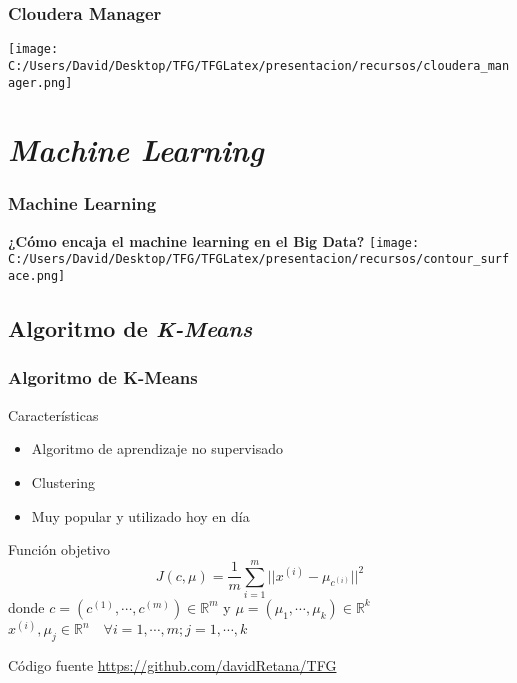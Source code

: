\documentclass{beamer}
\begin{document}
\begin{frame}
  \frametitle{Cloudera Manager}
  \texttt{[image: C:/Users/David/Desktop/TFG/TFGLatex/presentacion/recursos/cloudera\_manager.png]}
\end{frame}


\section{\textit{Machine Learning}}

\begin{frame} %
\frametitle{Machine Learning}
\textbf{¿Cómo encaja el machine learning en el Big Data?}
\centering
\texttt{[image: C:/Users/David/Desktop/TFG/TFGLatex/presentacion/recursos/contour\_surface.png]}
\end{frame}


\subsection{Algoritmo de \textit{K-Means}}

\begin{frame}[fragile] %
\frametitle{Algoritmo de K-Means}

\begin{block}{Características}
  \begin{itemize}
    \item Algoritmo de aprendizaje no supervisado
    \item Clustering
    \item Muy popular y utilizado hoy en día
  \end{itemize}
\end{block}

\begin{block}{Función objetivo}
  $$ J(c, \mu) = \frac{1}{m} \sum_{i=1}^m || x^{(i)} - \mu_{c^{(i)}} ||^2 $$ 
  \centering
  donde $c = (c^{(1)}, \cdots, c^{(m)}) \in \mathds{R}^m$ y $\mu = (\mu_1, \cdots, \mu_k) \in \mathds{R}^k$ \\
  $x^{(i)}, \mu_j \in \mathds{R}^n \quad \forall i=1,\cdots,m; j=1,\cdots,k$
\end{block}

\begin{block}{Código fuente}
\url{https://github.com/davidRetana/TFG}
\end{block}

\end{frame}
\end{document}
